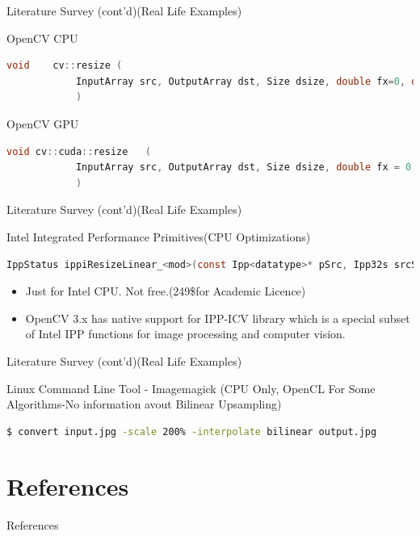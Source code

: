 \documentclass{beamer}
\begin{document}
	\begin{frame}[fragile]{Literature Survey (cont'd)(Real Life Examples)}
		\begin{block}{OpenCV CPU}		
			\begin{lstlisting}[language=C]
			void 	cv::resize (
			InputArray src, OutputArray dst, Size dsize, double fx=0, double fy=0, int interpolation=INTER_LINEAR
			)
			\end{lstlisting}
		\end{block}
		\begin{block}{OpenCV GPU}		
		
			\begin{lstlisting}[language=C]
			void cv::cuda::resize	(
			InputArray src, OutputArray dst, Size dsize, double fx = 0, double fy = 0, int interpolation = INTER_LINEAR, Stream &stream=Stream::Null() 
			)	
			\end{lstlisting}
		\end{block}
	\end{frame}
	\begin{frame}[fragile]{Literature Survey (cont'd)(Real Life Examples)}
		\begin{block}{Intel Integrated Performance Primitives(CPU Optimizations)}
			\begin{lstlisting}[language=C]
				IppStatus ippiResizeLinear_<mod>(const Ipp<datatype>* pSrc, Ipp32s srcStep, Ipp<datatype>* pDst, Ipp32s dstStep, IppiPoint dstOffset, IppiSize dstSize, IppiBorderType border, const Ipp<datatype>* pBorderValue, const IppiResizeSpec_32f* pSpec, Ipp8u* pBuffer)
			\end{lstlisting}
		\end{block}
		\begin{itemize}
			\item Just for Intel CPU. Not free.(249\$for Academic Licence)
			\item\justifying OpenCV 3.x has native support for IPP-ICV library which is a special subset of Intel IPP functions for image processing and computer vision.
		\end{itemize}
	\end{frame}
	\begin{frame}[fragile]{Literature Survey (cont'd)(Real Life Examples)}
		\begin{block}{Linux Command Line Tool - Imagemagick (CPU Only, OpenCL For Some Algorithms-No information avout Bilinear Upsampling)}
			\begin{lstlisting}[language=bash]
				$ convert input.jpg -scale 200% -interpolate bilinear output.jpg
			\end{lstlisting}
		\end{block}
	\end{frame}

	
\section{References}
	\begin{block}{References}
	\end{block}
	
	
\end{document}
